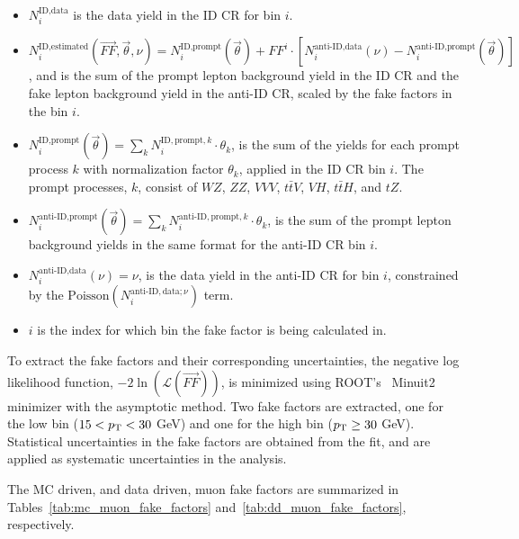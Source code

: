 \begin{itemize}
  \item $N_{i}^{\text{ID}, \text{data}}$ is the data yield in the ID CR for \pt{} bin $i$.
  \item $N_{i}^{\text{ID}, \text{estimated}}(\overrightarrow{FF}, \vec{\theta}, \nu) = N_{i}^{\text{ID}, \text{prompt}}(\vec{\theta}) + FF^{i} \cdot [N_{i}^{\text{anti-ID}, \text{data}}(\nu) - N_{i}^{\text{anti-ID}, \text{prompt}}(\vec{\theta})]$, and is the sum of the prompt lepton background yield in the ID CR and the fake lepton background yield in the anti-ID CR, scaled by the fake factors in the \pt{} bin $i$.
  \item $N_{i}^{\text{ID}, \text{prompt}}(\vec{\theta}) = \sum_{k} N_{i}^{\text{ID}, \text{prompt}, k} \cdot \theta_{k}$, is the sum of the yields for each prompt process $k$ with normalization factor $\theta_{k}$, applied in the ID CR \pt{} bin $i$. The prompt processes, $k$, consist of $WZ$, $ZZ$, $VVV$, $t\bar{t}V$, $VH$, $t\bar{t}H$, and $tZ$.
  \item $N_{i}^{\text{anti-ID}, \text{prompt}}(\vec{\theta}) = \sum_{k} N_{i}^{\text{anti-ID}, \text{prompt}, k} \cdot \theta_{k}$, is the sum of the prompt lepton background yields in the same format for the anti-ID CR \pt{} bin $i$.
  \item $N_{i}^{\text{anti-ID}, \text{data}}(\nu) = \nu$, is the data yield in the anti-ID CR for \pt{} bin $i$, constrained by the $\text{Poisson}(N_{i}^{\text{anti-ID}, \text{data}; \nu})$ term.
  \item $i$ is the index for which \pt{} bin the fake factor is being calculated in.
\end{itemize}

To extract the fake factors and their corresponding uncertainties, the negative log likelihood function, $-2 \ln(\mathcal{L}(\overrightarrow{FF}))$, is minimized using ROOT's~\cite{rene_brun_2019_3895860} Minuit2 minimizer with the asymptotic method. Two fake factors are extracted, one for the low \pt{} bin ($15 < p_{\mathrm{T}} < 30$ GeV) and one for the high \pt{} bin ($p_{\mathrm{T}} \geq 30$ GeV). Statistical uncertainties in the fake factors are obtained from the fit, and are applied as systematic uncertainties in the analysis. 

The MC driven, and data driven, muon fake factors are summarized in Tables~\ref{tab:mc_muon_fake_factors} and~\ref{tab:dd_muon_fake_factors}, respectively.

